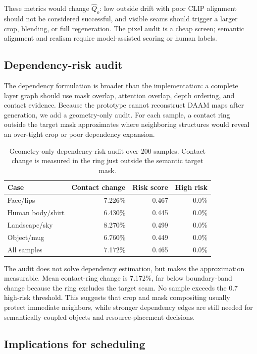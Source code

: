 \documentclass[final,5p,times,number,sort&compress]{elsarticle}
\begin{document}
These metrics would change \(\widehat{Q}_o\): low outside drift with poor CLIP alignment should not be considered successful, and visible seams should trigger a larger crop, blending, or full regeneration. The pixel audit is a cheap screen; semantic alignment and realism require model-assisted scoring or human labels.

\subsection{Dependency-risk audit}

The dependency formulation is broader than the implementation: a complete layer graph should use mask overlap, attention overlap, depth ordering, and contact evidence. Because the prototype cannot reconstruct DAAM maps after generation, we add a geometry-only audit. For each sample, a contact ring outside the target mask approximates where neighboring structures would reveal an over-tight crop or poor dependency expansion.

\begin{table}[t]
\centering
\scriptsize
\caption{Geometry-only dependency-risk audit over 200 samples. Contact change is measured in the ring just outside the semantic target mask.}
\label{tab:dependency-audit}
\begin{tabular}{lrrr}
\toprule
Case & Contact change & Risk score & High risk \\
\midrule
Face/lips & 7.226\% & 0.467 & 0.0\% \\
Human body/shirt & 6.430\% & 0.445 & 0.0\% \\
Landscape/sky & 8.270\% & 0.499 & 0.0\% \\
Object/mug & 6.760\% & 0.449 & 0.0\% \\
\midrule
All samples & 7.172\% & 0.465 & 0.0\% \\
\bottomrule
\end{tabular}
\end{table}

The audit does not solve dependency estimation, but makes the approximation measurable. Mean contact-ring change is 7.172\%, far below boundary-band change because the ring excludes the target seam. No sample exceeds the 0.7 high-risk threshold. This suggests that crop and mask compositing usually protect immediate neighbors, while stronger dependency edges are still needed for semantically coupled objects and resource-placement decisions.

\subsection{Implications for scheduling}
\end{document}
